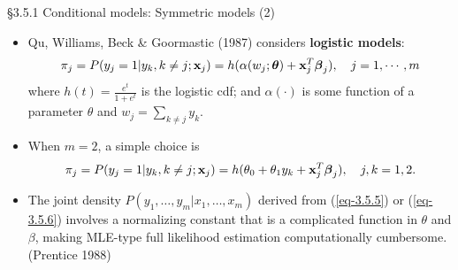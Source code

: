 \documentclass{beamer}
\newenvironment{wideitemize}%
  {\begin{itemize}%
    \setlength{\parskip}{1em}}%
  {\end{itemize}}
\begin{document}
%
%







\begin{frame}{\S3.5.1 Conditional models: Symmetric models (2)}

\begin{wideitemize}
\item
Qu, Williams, Beck \& Goormastic (1987) considers \textbf{logistic models}:
\begin{equation}
\pi_j=P(y_j=1|y_k, k\neq j; \textbf{x}_j)=h(\alpha(w_j; \mbox{\boldmath $\theta$})+
\textbf{x}_j^T\mbox{\boldmath $\beta$}_j),
\quad j=1,\cdots,m
\label{eq-3.5.5}
\end{equation}
where $\displaystyle h(t)=\frac{e^t}{1+e^t}$ is the logistic cdf; and $\alpha(\cdot)$ is some
function of a parameter $\theta$ and $w_j=\sum_{k\neq j} y_k$. 
\item
When $m=2$, a simple choice is
\begin{equation}
\pi_j=P(y_j=1|y_k, k\neq j; \textbf{x}_j)=h(\theta_0+\theta_1 y_k+
\textbf{x}_j^T\mbox{\boldmath $\beta$}_j), \quad j,k=1,2.
\label{eq-3.5.6}
\end{equation}
\item The  joint density $P(y_1, \dots, y_m | x_1, \dots, x_m)$  derived from (\ref{eq-3.5.5}) or (\ref{eq-3.5.6}) involves a normalizing constant that  is a complicated function  in $\theta$ and $\beta$, making MLE-type full likelihood estimation computationally cumbersome. (Prentice 1988)

\end{wideitemize}
\end{frame}
\end{document}
